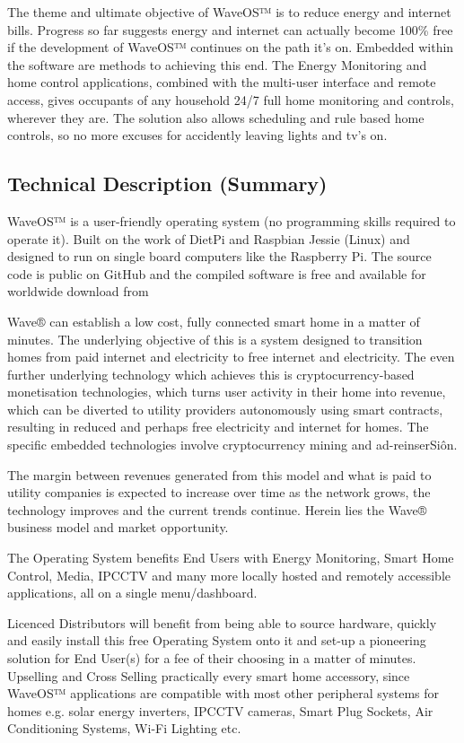\documentclass[letterpaper,10pt,english]{sphinxmanual}
\begin{document}
The theme and ultimate objective of WaveOS™ is to reduce energy and internet bills. Progress so far suggests energy and internet can actually become 100\% free if the development of WaveOS™ continues on the path it’s on. Embedded within the software are methods to achieving this end. The Energy Monitoring and home control applications, combined with the multi-user interface and remote access, gives occupants of any household 24/7 full home monitoring and controls, wherever they are. The solution also allows scheduling and rule based home controls, so no more excuses for accidently leaving lights and tv’s on.


\subsection{Technical Description (Summary)}
\label{\detokenize{appendix-a:technical-description-summary}}
WaveOS™ is a user-friendly operating system (no programming skills required to operate it). Built on the work of DietPi and Raspbian Jessie (Linux) and designed to run on single board computers  like the Raspberry Pi. The source code is public on GitHub and the compiled software is free and available for worldwide download from 

Wave® can establish a low cost, fully connected smart home in a matter of minutes. The underlying objective of this is a system designed to transition homes from paid internet and electricity to free internet and electricity. The even further underlying technology which achieves this is cryptocurrency-based monetisation technologies, which turns user activity in their home into revenue, which can be diverted to utility providers autonomously using smart contracts, resulting in reduced and perhaps free electricity and internet for homes. The specific embedded technologies involve cryptocurrency mining and ad-reinserSiôn.

The margin between revenues generated from this model and what is paid to utility companies is expected to increase over time as the network grows, the technology improves and the current trends continue. Herein lies the Wave® business model and market opportunity.

The Operating System benefits End Users with Energy Monitoring, Smart Home Control, Media, IPCCTV and many more locally hosted and remotely accessible applications, all on a single menu/dashboard.

Licenced Distributors will benefit from being able to source hardware, quickly and easily install this free Operating System onto it and set-up a pioneering solution for End User(s) for a fee of their choosing in a matter of minutes. Upselling and Cross Selling practically every smart home accessory, since WaveOS™ applications are compatible with most other peripheral systems for homes e.g. solar energy inverters, IPCCTV cameras, Smart Plug Sockets, Air Conditioning Systems, Wi-Fi Lighting etc.
\end{document}
